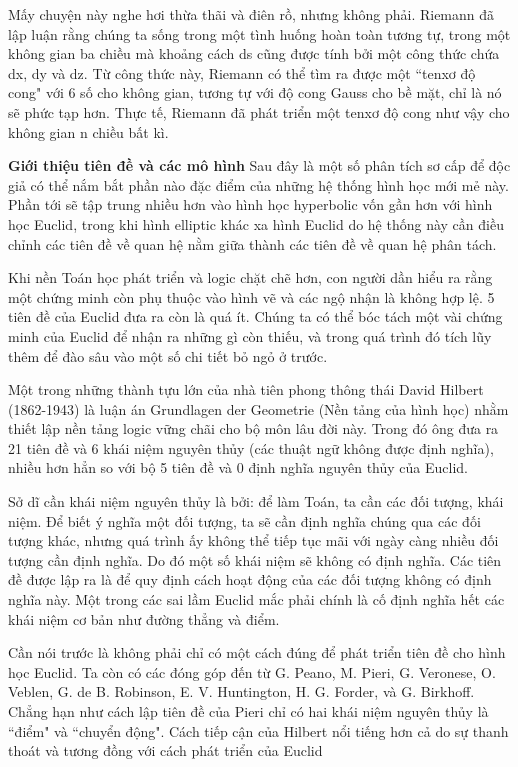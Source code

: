 \begin{multicols}{2}
	
	Mấy chuyện này nghe hơi thừa thãi và điên rồ, nhưng không phải. Riemann đã lập luận rằng chúng ta sống trong một tình huống hoàn toàn tương tự, trong một không gian ba chiều mà khoảng cách ds cũng được tính bởi một công thức chứa dx, dy và dz. Từ công thức này, Riemann có thể tìm ra được một ``tenxơ độ cong" với 6 số cho không gian, tương tự với độ cong Gauss cho bề mặt, chỉ là nó sẽ phức tạp hơn. Thực tế, Riemann đã phát triển một tenxơ độ cong như vậy cho không gian n chiều bất kì.
	
	\textbf{\color{lichsutoanhoc}Giới thiệu tiên đề và các mô hình}
	Sau đây là một số phân tích sơ cấp để độc giả có thể nắm bắt phần nào đặc điểm của những hệ thống hình học mới mẻ này. Phần tới sẽ tập trung nhiều hơn vào hình học hyperbolic vốn gần hơn với hình học Euclid, trong khi hình elliptic khác xa hình Euclid do hệ thống này cần điều chỉnh các tiên đề về quan hệ nằm giữa thành các tiên đề về quan hệ phân tách.  
	
	Khi nền Toán học phát triển và logic chặt chẽ hơn, con người dần hiểu ra rằng một chứng minh còn phụ thuộc vào hình vẽ và các ngộ nhận là không hợp lệ. 5 tiên đề của Euclid đưa ra còn là quá ít. Chúng ta có thể bóc tách một vài chứng minh của Euclid để nhận ra những gì còn thiếu, và trong quá trình đó tích lũy thêm để đào sâu vào một số chi tiết bỏ ngỏ ở trước. 
	
	Một trong những thành tựu lớn của nhà tiên phong thông thái David Hilbert (1862-1943) là luận án Grundlagen der Geometrie (Nền tảng của hình học) nhằm thiết lập nền tảng logic vững chãi cho bộ môn lâu đời này. Trong đó ông đưa ra 21 tiên đề và 6 khái niệm nguyên thủy (các thuật ngữ không được định nghĩa), nhiều hơn hẳn so với bộ 5 tiên đề và 0 định nghĩa nguyên thủy của Euclid.
	
	Sở dĩ cần khái niệm nguyên thủy là bởi: để làm Toán, ta cần các đối tượng, khái niệm. Để biết ý nghĩa một đối tượng, ta sẽ cần định nghĩa chúng qua các đối tượng khác, nhưng quá trình ấy không thể tiếp tục mãi với ngày càng nhiều đối tượng cần định nghĩa. Do đó một số khái niệm sẽ không có định nghĩa. Các tiên đề được lập ra là để quy định cách hoạt động của các đối tượng không có định nghĩa này. Một trong các sai lầm Euclid mắc phải chính là cố định nghĩa hết các khái niệm cơ bản như đường thẳng và điểm.
	
	Cần nói trước là không phải chỉ có một cách đúng để phát triển tiên đề cho hình học Euclid. Ta còn có các đóng góp đến từ G. Peano, M. Pieri, G. Veronese, O. Veblen, G. de B. Robinson, E. V. Huntington, H. G. Forder, và G. Birkhoff. Chẳng hạn như cách lập tiên đề của Pieri chỉ có hai khái niệm nguyên thủy là ``điểm" và ``chuyển động". Cách tiếp cận của Hilbert nổi tiếng hơn cả do sự thanh thoát và tương đồng với cách phát triển của Euclid
	

\end{multicols}
